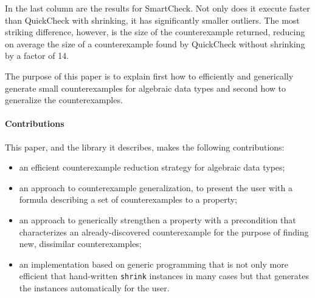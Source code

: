 \documentclass[10pt]{sigplanconf}
\newcommand{\ttp}[1]{\texttt{#1}}
\begin{document}
In the last column are the results for SmartCheck.  Not only does it execute
faster than QuickCheck with shrinking, it has significantly smaller outliers.
The most striking difference, however, is the size of the counterexample
returned, reducing on average the size of a counterexample found by QuickCheck
without shrinking by a factor of 14.

The purpose of this paper is to explain first how to efficiently and generically
generate small counterexamples for algebraic data types and second how to
generalize the counterexamples.

\paragraph{Contributions}
This paper, and the library it describes, makes the following contributions:

\begin{itemize}

\item an efficient counterexample reduction strategy for algebraic
  data types;

\item an approach to counterexample generalization, to present the
  user with a formula describing a set of counterexamples to a property;

\item an approach to generically strengthen a property with a precondition that
  characterizes an already-discovered counterexample for the purpose of finding
  new, dissimilar counterexamples;

\item an implementation based on generic programming that is not only more
  efficient that hand-written \ttp{shrink} instances in many cases but that
  generates the instances automatically for the user.

\end{itemize}

\end{document}
